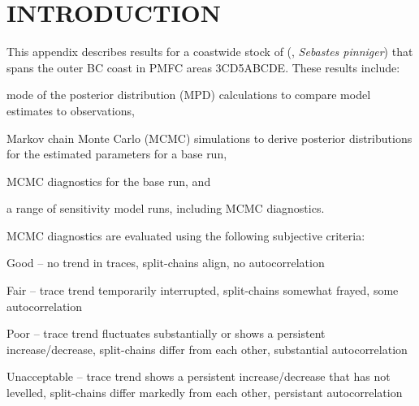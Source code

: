 \documentclass[11pt]{book}
\newcommand{\newstuff}[1]{\normalsize\textcolor{blue}{CAR: #1}\normalsize}
\begin{document}
\section{INTRODUCTION}


This appendix describes results for a coastwide stock of \SPP{} (\SPC, \emph{Sebastes pinniger}) that spans the outer BC coast in PMFC areas 3CD5ABCDE.
These results include:
\vspace{-0.5\baselineskip}%
\begin{itemize_csas}{}{}
\item mode of the posterior distribution (MPD) calculations to compare model estimates to observations, 
\item Markov chain Monte Carlo (MCMC) simulations to derive posterior distributions for the estimated parameters for a base run,
\item MCMC diagnostics for the base run, and
\item a range of sensitivity model runs, including MCMC diagnostics.
\end{itemize_csas}
MCMC diagnostics are evaluated using the following subjective criteria:
\begin{itemize_csas}{}{}
  \item Good -- no trend in traces, split-chains align, no autocorrelation
  \item Fair -- trace trend temporarily interrupted, split-chains somewhat frayed, some autocorrelation
  \item Poor -- trace trend fluctuates substantially or shows a persistent increase/decrease, split-chains differ from each other, substantial autocorrelation
  \item Unacceptable -- trace trend shows a persistent increase/decrease that has not levelled, split-chains differ markedly from each other, persistant autocorrelation
\end{itemize_csas}
\end{document}
